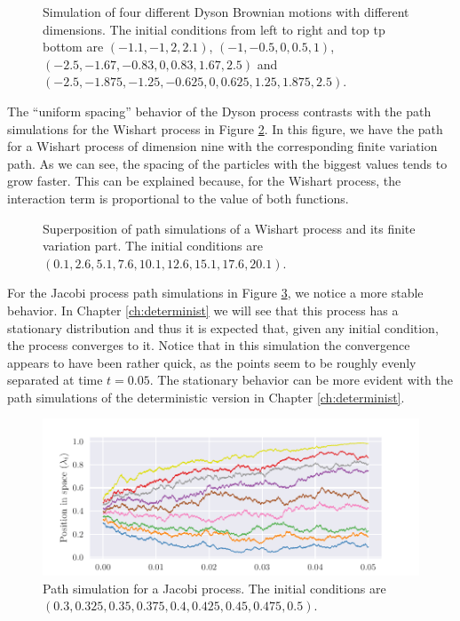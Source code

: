 \begin{figure}[h!] \centering 
    
    \caption{Simulation of four different Dyson Brownian motions with different dimensions. The initial conditions from left to right and top tp bottom are $(-1.1,-1,2,2.1)$, $(-1, -0.5, 0, 0.5, 1)$, $(-2.5,-1.67,-0.83,0,0.83,1.67,2.5)$ and $(-2.5,-1.875,-1.25,-0.625,0,0.625,1.25,1.875,2.5)$.\label{fig:four_dyson}}
\end{figure}

The ``uniform spacing'' behavior of the Dyson process contrasts with the path simulations for the Wishart process in Figure \ref{fig:wishart_comparison}. In this figure, we have the path for a Wishart process of dimension nine with the corresponding finite variation path. As we can see, the spacing of the particles with the biggest values tends to grow faster. This can be explained because, for the Wishart process, the interaction term is proportional to the value of both functions.

\begin{figure} \centering 
    
    \caption{Superposition of path simulations of a Wishart process and its finite variation part. The initial conditions are $(0.1,2.6,5.1,7.6,10.1,12.6,15.1,17.6,20.1)$.\label{fig:wishart_comparison}}
\end{figure}

For the Jacobi process path simulations in Figure \ref{fig:jacobi}, we notice a more stable behavior. In Chapter \ref{ch:determinist} we will see that this process has a stationary distribution and thus it is expected that, given any initial condition, the process converges to it. Notice that in this simulation the convergence appears to have been rather quick, as the points seem to be roughly evenly separated at time $t=0.05$. The stationary behavior can be more evident with the path simulations of the deterministic version in Chapter \ref{ch:determinist}.

\begin{figure} \centering
    \includegraphics[width=6in]{img/jacobi.pdf}
    \caption{Path simulation for a Jacobi process. The initial conditions are $(0.3,0.325,0.35,0.375,0.4,0.425,0.45,0.475,0.5)$.\label{fig:jacobi}}
\end{figure}


